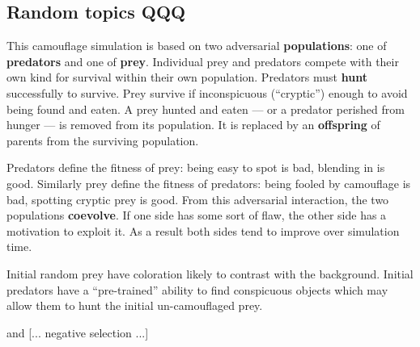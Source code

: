 \documentclass[sigconf]{acmart}
\begin{document}
\subsection{Random topics QQQ}
This camouflage simulation is based on two adversarial \textbf{populations}: one of \textbf{predators} and one of \textbf{prey}. Individual prey and predators compete with their own kind for survival within their own population. Predators must \textbf{hunt} successfully to survive. Prey survive if inconspicuous (“cryptic”) enough to avoid being found and eaten. A prey hunted and eaten — or a predator perished from hunger — is removed from its population. It is replaced by an \textbf{offspring} of parents from the surviving population.
\par
Predators define the fitness of prey: being easy to spot is bad, blending in is good. Similarly prey define the fitness of predators: being fooled by camouflage is bad, spotting cryptic prey is good. From this adversarial interaction, the two populations \textbf{coevolve}. If one side has some sort of flaw, the other side has a motivation to exploit it. As a result both sides tend to improve over simulation time.
\par
Initial random prey have coloration likely to contrast with the background. Initial predators have a “pre-trained” ability to find conspicuous objects which may allow them to hunt the initial un-camouflaged prey.
\par
[... relative fitness ...] and [... negative selection ...]
\par
[... tournaments relative fitness in game-like competition ...]
\end{document}
